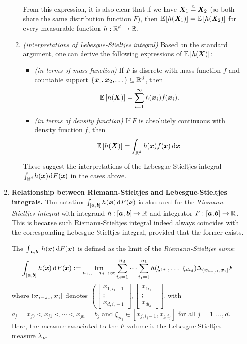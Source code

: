 \begin{enumerate}
\begin{enumerate}
From this expression, it is also clear that if we have \(\bm{X}_1\overset{\text{d}}=
\bm{X}_2\) (so both share the same distribution function \(F\)), then
\(\mathbb{E}\left[h(\bm{X}_1)\right]=\mathbb{E}\left[h(\bm{X}_2)\right]\) for every measurable function
\(h:\mathbb{R}^d\to\mathbb{R}\).
\item \emph{(interpretations of Lebesgue-Stieltjes integral)}
Based on the standard argument, one can derive the following expressions of
\(\mathbb{E}\left[h(\bm{X})\right]\):
\begin{itemize}
\item \emph{(in terms of mass function)} If \(F\) is discrete with mass
function \(f\) and countable support
\(\{\bm{x}_1,\bm{x}_2,\dotsc\}\subseteq \mathbb{R}^d\), then
\[
\mathbb{E}\left[h(\bm{X})\right]=\sum_{i=1}^{\infty}h(\bm{x}_i)f(\bm{x}_i).
\]
\item \emph{(in terms of density function)} If \(F\) is absolutely continuous
with density function \(f\), then
\[
\expv{h(\vect{X})}=\int_{\R^d}^{}h(\vect{x})f(\vect{x})\odif{\vect{x}}.
\]
\end{itemize}
These suggest the interpretations of the Lebesgue-Stieltjes integral
\(\int_{\R^d}^{}h(\vect{x})\odif{F(\vect{x})}\) in the cases above.
\end{enumerate}
\item \textbf{Relationship between Riemann-Stieltjes and Lebesgue-Stieltjes integrals.}
The notation \(\int_{[\vect{a},\vect{b}]}^{}h(\vect{x})\odif{F(\vect{x})}\) is
also used for the \emph{Riemann-Stieltjes integral} with integrand
\(h:[\bm{a},\bm{b}]\to\mathbb{R}\) and integrator \(F:[\bm{a},\bm{b}]\to\mathbb{R}\).
This is because such Riemann-Stieltjes integral indeed always coincides with the
corresponding Lebesgue-Stieltjes integral, provided that the former exists.

The 
\(\int_{[\vect{a},\vect{b}]}^{}h(\vect{x})\odif{F(\vect{x})}\) is defined as
the limit of the \emph{Riemann-Stieltjes sums}:
\[
\int_{[\vect{a},\vect{b}]}^{}h(\vect{x})\odif{F(\vect{x})}
:=\lim_{n_1,,\dotsc,n_d\to\infty}\sum_{i_d=1}^{n_d}\dotsb\sum_{i_1=1}^{n_1}h(\xi_{1i_1},\dotsc,\xi_{di_{d}})
\Delta_{(\vect{x}_{\vect{i}-{}_{d}1},\vect{x}_{\vect{i}}]}F
\]
where \((\bm{x}_{\bm{i}-{}_{d}1},\bm{x}_{\bm{i}}]\) denotes \(\left(
\begin{bmatrix}x_{1,i_1-1}\\\vdots\\ x_{d,i_d-1}\end{bmatrix},
\begin{bmatrix}x_{1i_1}\\\vdots\\ x_{di_d}\end{bmatrix}
\right]\), with \(a_j=x_{j0}<x_{j1}<\dotsb<x_{jn}=b_j\) and
\(\xi_{ji_j}\in[x_{j,i_j-1},x_{j,i_j}]\) for all \(j=1,\dotsc,d\).
Here, the measure associated to the \(F\)-volume is the Lebesgue-Stieltjes
measure \(\lambda_{F}\).


\end{enumerate}
